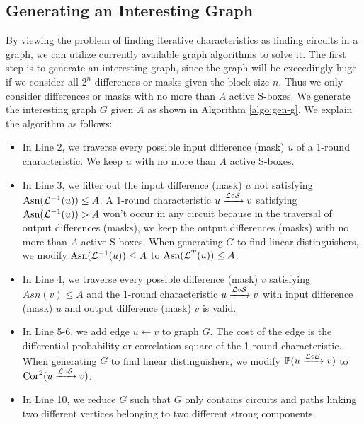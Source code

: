 \subsection{Generating an Interesting Graph}\label{sec:gen_G}

By viewing the problem of finding iterative characteristics as finding circuits in a graph, we can utilize currently available graph algorithms to solve it. The first step is to generate an interesting graph, since the graph will be exceedingly huge if we consider all $2^n$ differences or masks given the block size $n$. Thus we only consider differences or masks with no more than $A$ active S-boxes. We generate the interesting graph $G$ given $A$ as shown in Algorithm \ref{algo:gen-g}. We explain the algorithm as follows: 
\begin{itemize}
    \item In Line 2, we traverse every possible input difference (mask) $u$ of a 1-round characteristic. We keep $u$ with no more than $A$ active S-boxes. 
    \item In Line 3, we filter out the input difference (mask) $u$ not satisfying $\text{Asn}(\mathcal{L}^{-1}(u))\le A$. A 1-round characteristic $u\xrightarrow{\mathcal{L}\circ\mathcal{S}}v$ satisfying $\text{Asn}(\mathcal{L}^{-1}(u))>A$ won't occur in any circuit because in the traversal of output differences (masks), we keep the output differences (masks) with no more than $A$ active S-boxes. When generating $G$ to find linear distinguishers, we modify $\text{Asn}(\mathcal{L}^{-1}(u))\le A$ to $\text{Asn}(\mathcal{L}^{T}(u))\le A$.
    \item In Line 4, we traverse every possible difference (mask) $v$ satisfying $Asn(v)\le A$ and the 1-round characteristic $u\xrightarrow{\mathcal{L}\circ\mathcal{S}}v$ with input difference (mask) $u$ and output difference (mask) $v$ is valid. 
    \item In Line 5-6, we add edge $u\leftarrow v$ to graph $G$. The cost of the edge is the differential probability or correlation square of the 1-round characteristic. When generating $G$ to find linear distinguishers, we modify $\mathbb{P}(u\xrightarrow{\mathcal{L}\circ\mathcal{S}}v)$ to $\text{Cor}^2(u\xrightarrow{\mathcal{L}\circ\mathcal{S}}v)$. 
    \item In Line 10, we reduce $G$ such that $G$ only contains circuits and paths linking two different vertices belonging to two different strong components. 
\end{itemize}

